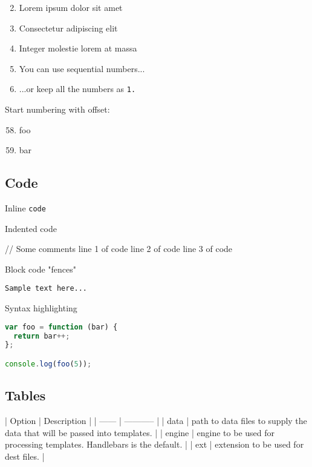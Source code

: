 \documentclass{article}
\begin{document}
\begin{enumerate}
\setcounter{enumi}{1}
\item Lorem ipsum dolor sit amet
\item Consectetur adipiscing elit
\item Integer molestie lorem at massa




\item You can use sequential numbers...
\item ...or keep all the numbers as \verb|1.|


\end{enumerate}
Start numbering with offset:

\begin{enumerate}
\setcounter{enumi}{57}
\item foo
\item bar




\end{enumerate}
\subsection{Code}

Inline \verb|code|

Indented code

// Some comments
line 1 of code
line 2 of code
line 3 of code




Block code "fences"

\begin{lstlisting}
Sample text here...

\end{lstlisting}


Syntax highlighting

\begin{lstlisting}[language=js]
var foo = function (bar) {
  return bar++;
};

console.log(foo(5));

\end{lstlisting}


\subsection{Tables}

| Option | Description |
| ------ | ----------- |
| data   | path to data files to supply the data that will be passed into templates. |
| engine | engine to be used for processing templates. Handlebars is the default. |
| ext    | extension to be used for dest files. |
\end{document}
